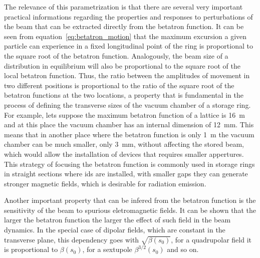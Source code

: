 	The relevance of this parametrization is that there are several very important practical informations regarding the properties and responses to perturbations of the beam that can be extracted directly from the betatron function. It can be seen from equation~\eqref{eq:betatron_motion} that the maximum excursion a given particle can experience in a fixed longitudinal point of the ring is proportional to the square root of the betatron function. Analogously, the beam size of a distribution in equilibrium will also be proportional to the square root of the local betatron function. Thus, the ratio between the amplitudes of movement in two different positions is proportional to the ratio of the square root of the betatron functions at the two locations, a property that is fundamental in the process of defining the transverse sizes of the vacuum chamber of a storage ring. For example, lets suppose the maximum betatron function of a lattice is \SI{16}{\meter} and at this place the vacuum chamber has an internal dimension of \SI{12}{\milli\meter}. This means that in another place where the betatron function is only \SI{1}{\meter} the vacuum chamber can be much smaller, only \SI{3}{\milli\meter}, without affecting the stored beam, which would allow the installation of devices that requires smaller appertures. This strategy of focusing the betatron function is commonly used in storage rings in straight sections where \gls{ids} are installed, with smaller gaps they can generate stronger magnetic fields, which is desirable for radiation emission.

	Another important property that can be infered from the betatron function is the sensitivity of the beam to spurious eletromagnetic fields. It can be shown that the larger the betatron function the larger the effect of such field in the beam dynamics. In the special case of dipolar fields, which are constant in the transverse plane, this dependency goes with $\sqrt{\beta(s_0)}$, for a quadrupolar field it is proportional to $\beta(s_0)$, for a sextupole $\beta^{3/2}(s_0)$ and so on.

